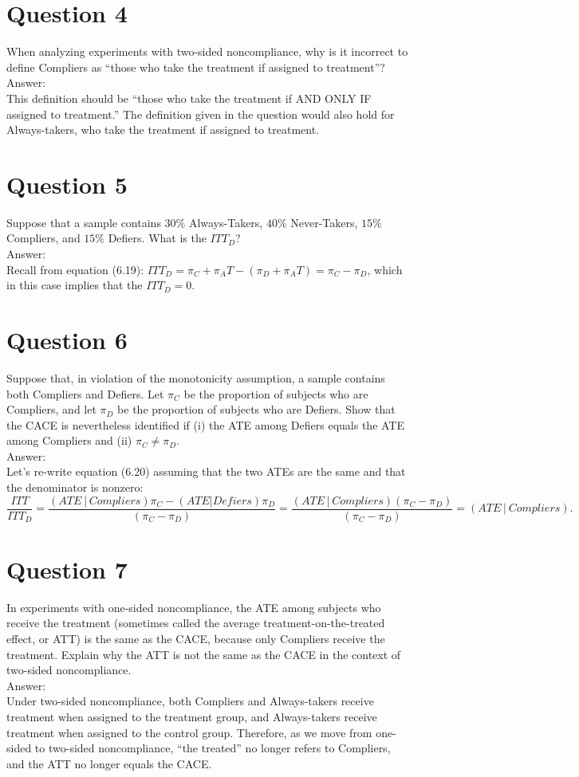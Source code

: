 \documentclass[11pt,notitlepage]{article}\usepackage[]{graphicx}\usepackage[]{color}
\begin{document}
\section*{Question 4}
When analyzing experiments with two-sided noncompliance, why is it incorrect to define Compliers as ``those who take the treatment if assigned to treatment''? \\
Answer:\\
This definition should be ``those who take the treatment if AND ONLY IF assigned to treatment.''  The definition given in the question would also hold for Always-takers, who take the treatment if assigned to treatment.

\section*{Question 5}
Suppose that a sample contains $30\%$ Always-Takers, $40\%$ Never-Takers, $15\%$ Compliers, and $15\%$ Defiers. What is the $ITT_D$? \\
Answer:\\
Recall from equation (6.19): $ITT_D= \pi_C+ \pi_AT- (\pi_D + \pi_AT) = \pi_C- \pi_D$, which in this case implies that the $ITT_D = 0$.

\section*{Question 6}
Suppose that, in violation of the monotonicity assumption, a sample contains both Compliers and Defiers. Let $\pi_C$ be the proportion of subjects who are Compliers, and let $\pi_D$ be the proportion of subjects who are Defiers. Show that the CACE is nevertheless identified if (i) the ATE among Defiers equals the ATE among Compliers and (ii) $\pi_C \neq \pi_D$.\\
Answer:\\
Let's re-write equation (6.20) assuming that the two ATEs are the same and that the denominator is nonzero:
\begin{equation*}
\frac{ITT}{ITT_D} =\frac{(ATE│Compliers) \pi_C-(ATE|Defiers)\pi_D}{(\pi_C-\pi_D )}=\frac{(ATE│Compliers) (\pi_C- \pi_D)}{(\pi_C-\pi_D)}=(ATE│Compliers).
\end{equation*}

\section*{Question 7}
In experiments with one-sided noncompliance, the ATE among subjects who receive the treatment (sometimes called the average treatment-on-the-treated effect, or ATT) is the same as the CACE, because only Compliers receive the treatment. Explain why the ATT is not the same as the CACE in the context of two-sided noncompliance.\\
Answer:\\
Under two-sided noncompliance, both Compliers and Always-takers receive treatment when assigned to the treatment group, and Always-takers receive treatment when assigned to the control group. Therefore, as we move from one-sided to two-sided noncompliance, ``the treated'' no longer refers to Compliers, and the ATT no longer equals the CACE.
\end{document}
